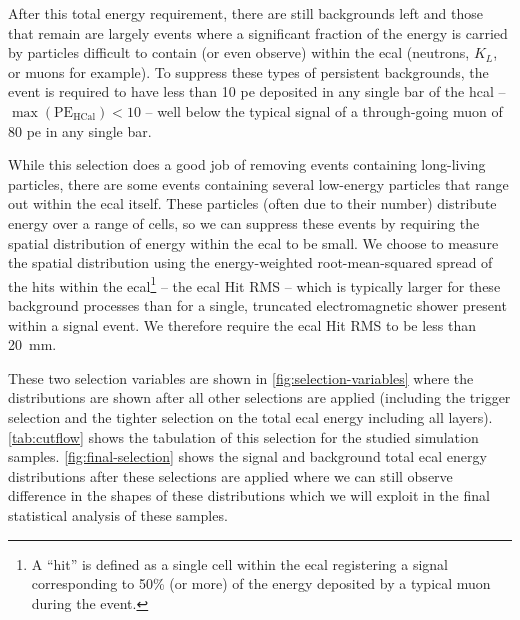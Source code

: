 After this total energy requirement, there are still backgrounds left and those that remain are largely
events where a significant fraction of the energy is carried by particles difficult to contain (or even observe)
within the \ac{ecal} (neutrons, $K_L$, or muons for example).
To suppress these types of persistent backgrounds, the event is required to have less than 10 \ac{pe}
deposited in any single bar of the \ac{hcal} -- $\max(\mathrm{PE}_\mathrm{HCal}) < 10$ --
well below the typical signal of a through-going muon of 80 \ac{pe} in any single bar.

While this selection does a good job of removing events containing long-living particles, there are some
events containing several low-energy particles that range out within the \ac{ecal} itself.
These particles (often due to their number) distribute energy over a range of cells,
so we can suppress these events by requiring the spatial distribution of energy within the \ac{ecal} to be small.
We choose to measure the spatial distribution using the energy-weighted root-mean-squared spread of the
hits within the \ac{ecal}\footnote{
  A ``hit'' is defined as a single cell within the \ac{ecal} registering a signal corresponding to 50\% (or more)
  of the energy deposited by a typical muon during the event.
}
-- the \ac{ecal} Hit RMS -- which is typically larger for these background processes than for a single,
truncated electromagnetic shower present within a signal event.
We therefore require the \ac{ecal} Hit RMS to be less than \qty{20}{\mm}.

These two selection variables are shown in \cref{fig:selection-variables}
where the distributions are shown after all other selections are applied
(including the trigger selection and the tighter selection on the total \ac{ecal} energy including all layers).
\cref{tab:cutflow} shows the tabulation of this selection for the studied simulation samples.
\cref{fig:final-selection} shows the signal and background total \ac{ecal} energy distributions after
these selections are applied where we can still observe difference in the shapes of these distributions which
we will exploit in the final statistical analysis of these samples.

